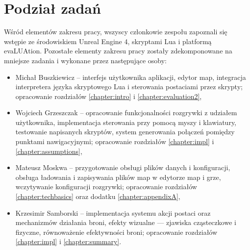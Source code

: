 \section{Podział zadań}
Wśród elementów zakresu pracy, wszyscy członkowie zespołu zapoznali się wstępie ze środowiskiem Unreal Engine 4, skryptami Lua i platformą evaLUAtion. Pozostałe elementy zakresu pracy zostały zdekomponowane na mniejsze zadania i wykonane przez następujące osoby:
\begin{itemize}
    \item Michał Buszkiewicz -- interfejs użytkownika aplikacji, edytor map, integracja interpretera języka skryptowego Lua i sterowania postaciami przez skrypty; opracowanie rozdziałów \ref{chapter:intro} i \ref{chapter:evaluation2},
    \item Wojciech Grzeszczak -- opracowanie funkcjonalności rozgrywki z udziałem użytkownika, implementacja sterowania przy pomocą myszy i klawiatury, testowanie napisanych skryptów, system generowania połączeń pomiędzy punktami nawigacyjnymi; opracowanie rozdziałów \ref{chapter:impl} i \ref{chapter:assumptions},
    \item Mateusz Moskwa -- przygotowanie obsługi plików danych i konfiguracji, obsługa ładowania i zapisywania plików map w edytorze map i grze, wczytywanie konfiguracji rozgrywki; opracowanie rozdziałów \ref{chapter:techbasics} oraz dodatku \ref{chapter:appendixA},
    \item Krzesimir Samborski -- implementacja systemu akcji postaci oraz mechanizmów działania broni, efekty wizualne --- zjawiska cząsteczkowe i fizyczne, równoważenie efektywności broni; opracowanie rozdziałów \ref{chapter:impl} i \ref{chapter:summary}.
\end{itemize}



